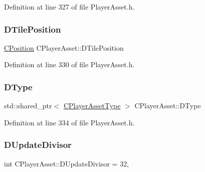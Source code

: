 Definition at line 327 of file Player\+Asset.\+h.

\hypertarget{classCPlayerAsset_a5b59a9d3b7db8c7fa194b80dafb96186}{}\label{classCPlayerAsset_a5b59a9d3b7db8c7fa194b80dafb96186} 
\subsubsection{\texorpdfstring{D\+Tile\+Position}{DTilePosition}}
{\footnotesize\ttfamily \hyperlink{classCPosition}{C\+Position} C\+Player\+Asset\+::\+D\+Tile\+Position\hspace{0.3cm}{\ttfamily [protected]}}



Definition at line 330 of file Player\+Asset.\+h.

\hypertarget{classCPlayerAsset_a5d61f73471e1e6f0a6ab15f2ffa7b359}{}\label{classCPlayerAsset_a5d61f73471e1e6f0a6ab15f2ffa7b359} 
\subsubsection{\texorpdfstring{D\+Type}{DType}}
{\footnotesize\ttfamily std\+::shared\+\_\+ptr$<$ \hyperlink{classCPlayerAssetType}{C\+Player\+Asset\+Type} $>$ C\+Player\+Asset\+::\+D\+Type\hspace{0.3cm}{\ttfamily [protected]}}



Definition at line 334 of file Player\+Asset.\+h.

\hypertarget{classCPlayerAsset_a09d17faf2ad70e2f778095a3c314d398}{}\label{classCPlayerAsset_a09d17faf2ad70e2f778095a3c314d398} 
\subsubsection{\texorpdfstring{D\+Update\+Divisor}{DUpdateDivisor}}
{\footnotesize\ttfamily int C\+Player\+Asset\+::\+D\+Update\+Divisor = 32\hspace{0.3cm}{\ttfamily [static]}, {\ttfamily [protected]}}



